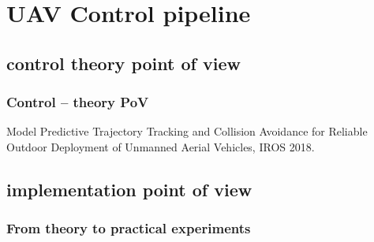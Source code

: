 \documentclass[aspectratio=1610]{beamer}
\begin{document}
\section{UAV Control pipeline}
\subsection{control theory point of view}

\begin{frame}
  \frametitle{Control -- theory PoV}

  \begin{figure}
    \begin{adjustbox}{max totalsize={1.0\textwidth}{.85\textheight}, center}
      
    \end{adjustbox}
  \end{figure}

  \begin{block}{\cite{iros}}
    Model Predictive Trajectory Tracking and Collision Avoidance for Reliable Outdoor Deployment of Unmanned Aerial Vehicles, IROS 2018.
  \end{block}

\end{frame}

\subsection{implementation point of view}



\begin{frame}
  \frametitle{From theory to practical experiments}

  \begin{columns}[c]



  \end{columns}

\end{frame}
\end{document}

